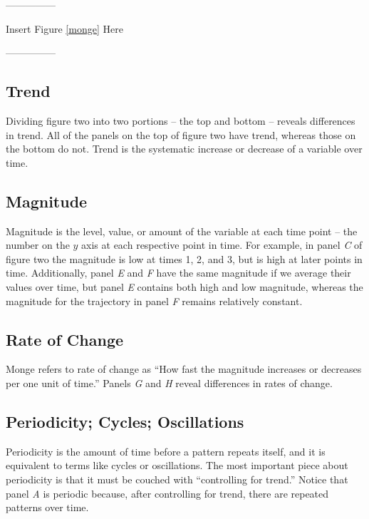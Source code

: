 \documentclass[english,,man]{apa6}
\theoremstyle{definition}
\theoremstyle{definition}
\theoremstyle{definition}
\theoremstyle{remark}
\begin{document}
\begin{center}

---------------

Insert Figure \ref{monge} Here

---------------

\end{center}

\hypertarget{trend}{%
\subsection{Trend}\label{trend}}

Dividing figure two into two portions -- the top and bottom -- reveals
differences in trend. All of the panels on the top of figure two have
trend, whereas those on the bottom do not. Trend is the systematic
increase or decrease of a variable over time.

\hypertarget{magnitude}{%
\subsection{Magnitude}\label{magnitude}}

Magnitude is the level, value, or amount of the variable at each time
point -- the number on the \(y\) axis at each respective point in time.
For example, in panel \emph{C} of figure two the magnitude is low at
times 1, 2, and 3, but is high at later points in time. Additionally,
panel \emph{E} and \emph{F} have the same magnitude if we average their
values over time, but panel \emph{E} contains both high and low
magnitude, whereas the magnitude for the trajectory in panel \emph{F}
remains relatively constant.

\hypertarget{rate-of-change}{%
\subsection{Rate of Change}\label{rate-of-change}}

Monge refers to rate of change as \enquote{How fast the magnitude
increases or decreases per one unit of time.} Panels \emph{G} and
\emph{H} reveal differences in rates of change.

\hypertarget{periodicity-cycles-oscillations}{%
\subsection{Periodicity; Cycles;
Oscillations}\label{periodicity-cycles-oscillations}}

Periodicity is the amount of time before a pattern repeats itself, and
it is equivalent to terms like cycles or oscillations. The most
important piece about periodicity is that it must be couched with
\enquote{controlling for trend.} Notice that panel \emph{A} is periodic
because, after controlling for trend, there are repeated patterns over
time.
\end{document}
